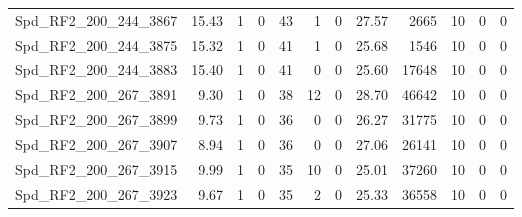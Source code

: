 \begin{longtable}[c]{@{}lrrrrrrrrrrr@{}}
Spd\_RF2\_200\_244\_3867     & 15.43                  & 1                       & 0                       & 43                     & 1                       & 0                       & 27.57                   & 2665                     & 10                       & 0                        & 0                        \\
Spd\_RF2\_200\_244\_3875     & 15.32                  & 1                       & 0                       & 41                     & 1                       & 0                       & 25.68                   & 1546                     & 10                       & 0                        & 0                        \\
Spd\_RF2\_200\_244\_3883     & 15.40                  & 1                       & 0                       & 41                     & 0                       & 0                       & 25.60                   & 17648                    & 10                       & 0                        & 0                        \\
Spd\_RF2\_200\_267\_3891     & 9.30                   & 1                       & 0                       & 38                     & 12                      & 0                       & 28.70                   & 46642                    & 10                       & 0                        & 0                        \\
Spd\_RF2\_200\_267\_3899     & 9.73                   & 1                       & 0                       & 36                     & 0                       & 0                       & 26.27                   & 31775                    & 10                       & 0                        & 0                        \\
Spd\_RF2\_200\_267\_3907     & 8.94                   & 1                       & 0                       & 36                     & 0                       & 0                       & 27.06                   & 26141                    & 10                       & 0                        & 0                        \\
Spd\_RF2\_200\_267\_3915     & 9.99                   & 1                       & 0                       & 35                     & 10                      & 0                       & 25.01                   & 37260                    & 10                       & 0                        & 0                        \\
Spd\_RF2\_200\_267\_3923     & 9.67                   & 1                       & 0                       & 35                     & 2                       & 0                       & 25.33                   & 36558                    & 10                       & 0                        & 0                        \\

\end{longtable}
